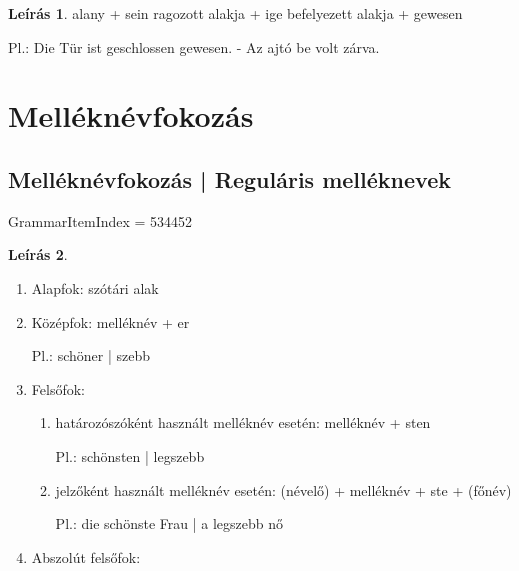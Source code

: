 \documentclass{article}
\theoremstyle{definition}
\newtheorem*{desc}{Leírás}
\begin{document}
\begin{desc}
alany + sein ragozott alakja + ige befelyezett alakja + gewesen

Pl.: Die Tür ist geschlossen gewesen. - Az ajtó be volt zárva.
\end{desc}

\section{Melléknévfokozás}

\subsection{Melléknévfokozás | Reguláris melléknevek}

GrammarItemIndex = 534452

\begin{desc}

\begin{enumerate}
\item Alapfok: szótári alak
\item Középfok: melléknév + er

Pl.: schöner | szebb

\item Felsőfok:
\begin{enumerate}
\item határozószóként használt melléknév esetén: melléknév + sten

Pl.: schönsten | legszebb

\item jelzőként használt melléknév esetén: (névelő) + melléknév + ste + (főnév)

Pl.: die schönste Frau | a legszebb nő
\end{enumerate}

\item Abszolút felsőfok:
\end{enumerate}
\end{desc}
\end{document}
